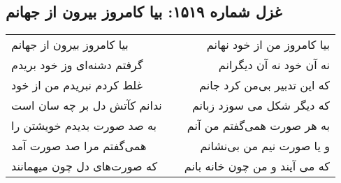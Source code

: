 \begin{center}
\section*{غزل شماره ۱۵۱۹: بیا کامروز بیرون از جهانم}
\label{sec:1519}
\begin{longtable}{l p{0.5cm} r}
بیا کامروز بیرون از جهانم
&&
بیا کامروز من از خود نهانم
\\
گرفتم دشنه‌ای وز خود بریدم
&&
نه آن خود نه آن دیگرانم
\\
غلط کردم نبریدم من از خود
&&
که این تدبیر بی‌من کرد جانم
\\
ندانم کآتش دل بر چه سان است
&&
که دیگر شکل می سوزد زبانم
\\
به صد صورت بدیدم خویشتن را
&&
به هر صورت همی‌گفتم من آنم
\\
همی‌گفتم مرا صد صورت آمد
&&
و یا صورت نیم من بی‌نشانم
\\
که صورت‌های دل چون میهمانند
&&
که می آیند و من چون خانه بانم
\\
\end{longtable}
\end{center}
